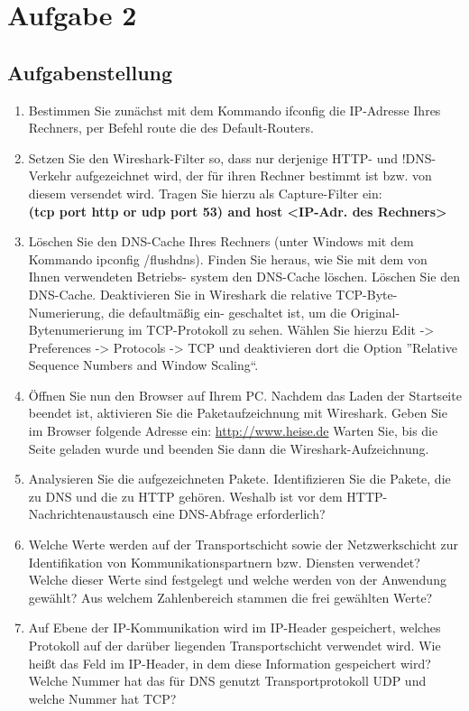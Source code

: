 \section{Aufgabe 2}
\subsection{Aufgabenstellung}
\begin{enumerate}[label=(\alph*)]
	\item Bestimmen Sie zunächst mit dem Kommando ifconfig die IP-Adresse Ihres Rechners, per Befehl route die des Default-Routers.
	\item Setzen Sie den Wireshark-Filter so, dass nur derjenige HTTP- und !DNS-Verkehr aufgezeichnet wird, der für ihren Rechner bestimmt ist bzw. von diesem versendet wird. Tragen Sie hierzu als Capture-Filter ein:\\\textbf{(tcp port http or udp port 53) and host <IP-Adr. des Rechners>}
	\item Löschen Sie den DNS-Cache Ihres Rechners (unter Windows mit dem Kommando ipconfig /flushdns). Finden Sie heraus, wie Sie mit dem von Ihnen verwendeten Betriebs- system den DNS-Cache löschen. Löschen Sie den DNS-Cache.
Deaktivieren Sie in Wireshark die relative TCP-Byte-Numerierung, die defaultmäßig ein- geschaltet ist, um die Original-Bytenumerierung im TCP-Protokoll zu sehen. Wählen Sie hierzu Edit -> Preferences -> Protocols -> TCP und deaktivieren dort die Option ”Relative Sequence Numbers and Window Scaling“.
	\item Öffnen Sie nun den Browser auf Ihrem PC. Nachdem das Laden der Startseite beendet ist, aktivieren Sie die Paketaufzeichnung mit Wireshark. Geben Sie im Browser folgende Adresse ein: \url{http://www.heise.de} Warten Sie, bis die Seite geladen wurde und beenden Sie dann die Wireshark-Aufzeichnung.
	\item Analysieren Sie die aufgezeichneten Pakete. Identifizieren Sie die Pakete, die zu DNS und die zu HTTP gehören. Weshalb ist vor dem HTTP-Nachrichtenaustausch eine DNS-Abfrage erforderlich?
	\item Welche Werte werden auf der Transportschicht sowie der Netzwerkschicht zur Identifikation von Kommunikationspartnern bzw. Diensten verwendet? Welche dieser Werte sind festgelegt und welche werden von der Anwendung gewählt? Aus welchem Zahlenbereich stammen die frei gewählten Werte?
	\item Auf Ebene der IP-Kommunikation wird im IP-Header gespeichert, welches Protokoll auf der darüber liegenden Transportschicht verwendet wird. Wie heißt das Feld im IP-Header, in dem diese Information gespeichert wird? Welche Nummer hat das für DNS genutzt Transportprotokoll UDP und welche Nummer hat TCP?

\end{enumerate}
